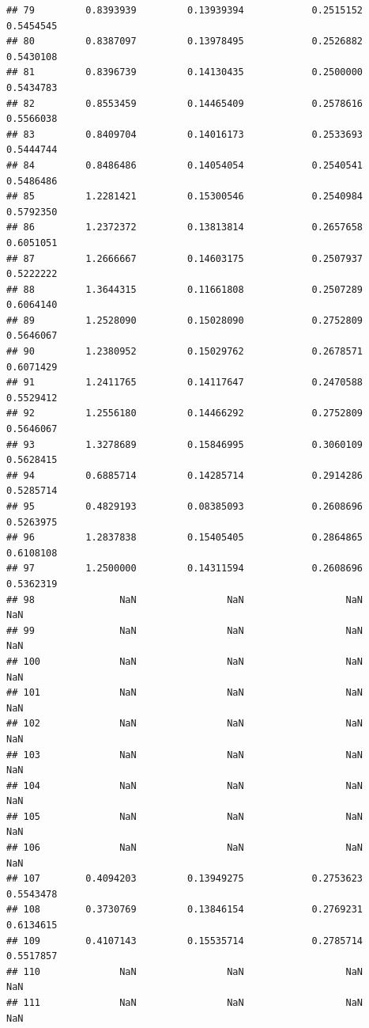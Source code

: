 \documentclass[]{article}
\begin{document}
\begin{verbatim}
## 79         0.8393939         0.13939394            0.2515152        0.5454545
## 80         0.8387097         0.13978495            0.2526882        0.5430108
## 81         0.8396739         0.14130435            0.2500000        0.5434783
## 82         0.8553459         0.14465409            0.2578616        0.5566038
## 83         0.8409704         0.14016173            0.2533693        0.5444744
## 84         0.8486486         0.14054054            0.2540541        0.5486486
## 85         1.2281421         0.15300546            0.2540984        0.5792350
## 86         1.2372372         0.13813814            0.2657658        0.6051051
## 87         1.2666667         0.14603175            0.2507937        0.5222222
## 88         1.3644315         0.11661808            0.2507289        0.6064140
## 89         1.2528090         0.15028090            0.2752809        0.5646067
## 90         1.2380952         0.15029762            0.2678571        0.6071429
## 91         1.2411765         0.14117647            0.2470588        0.5529412
## 92         1.2556180         0.14466292            0.2752809        0.5646067
## 93         1.3278689         0.15846995            0.3060109        0.5628415
## 94         0.6885714         0.14285714            0.2914286        0.5285714
## 95         0.4829193         0.08385093            0.2608696        0.5263975
## 96         1.2837838         0.15405405            0.2864865        0.6108108
## 97         1.2500000         0.14311594            0.2608696        0.5362319
## 98               NaN                NaN                  NaN              NaN
## 99               NaN                NaN                  NaN              NaN
## 100              NaN                NaN                  NaN              NaN
## 101              NaN                NaN                  NaN              NaN
## 102              NaN                NaN                  NaN              NaN
## 103              NaN                NaN                  NaN              NaN
## 104              NaN                NaN                  NaN              NaN
## 105              NaN                NaN                  NaN              NaN
## 106              NaN                NaN                  NaN              NaN
## 107        0.4094203         0.13949275            0.2753623        0.5543478
## 108        0.3730769         0.13846154            0.2769231        0.6134615
## 109        0.4107143         0.15535714            0.2785714        0.5517857
## 110              NaN                NaN                  NaN              NaN
## 111              NaN                NaN                  NaN              NaN

\end{verbatim}
\end{document}
